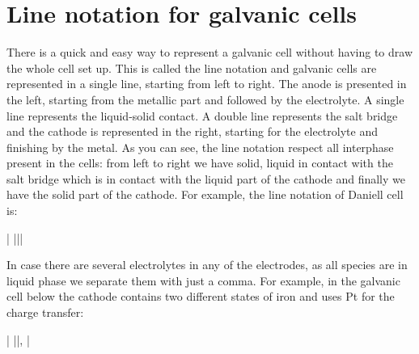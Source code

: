 \documentclass[main.tex]{subfiles}
\begin{document}
\section{Line notation for galvanic cells}
There is a quick and easy way to represent a galvanic cell without having to draw the whole cell set up. This is called the line notation and galvanic cells are represented in a single line, starting from left to right. The anode is presented in the left, starting from the metallic part and followed by the electrolyte. A single line represents the liquid-solid contact. A double line represents the salt bridge and the cathode is represented in the right, starting for the electrolyte and finishing by the metal. As you can see, the line notation respect all interphase present in the cells: from left to right we have solid, liquid in contact with the salt bridge which is in contact with the liquid part of the cathode and finally we have the solid part of the cathode.
For example, the line notation of Daniell cell is:
\begin{center}| |||	\end{center}
In case there are several electrolytes in any of the electrodes, as all species are in liquid phase we separate them with just a comma. For example, in the galvanic cell below the cathode contains two different states of iron and uses Pt for the charge transfer:
\begin{center}| ||, |	\end{center}
\end{document}
